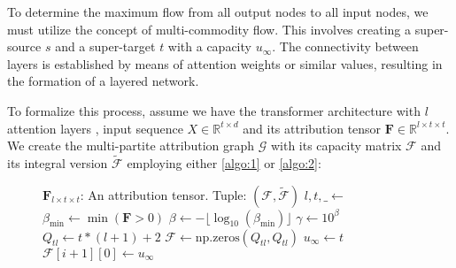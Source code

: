 \documentclass{article} %
\theoremstyle{bfnote}
\begin{document}
To determine the maximum flow from all output nodes to all input nodes, we must utilize the concept of multi-commodity flow. This involves creating a super-source $s$ and a super-target $t$ with a capacity $u_{\infty}$. The connectivity between layers is established by means of attention weights or similar values, resulting in the formation of a layered network.

To formalize this process, assume we have the transformer architecture with $l$ attention layers , input sequence $X\in \mathbb{R}^{t \times d}$ and its attribution tensor $\bm{F} \in \mathbb{R}^{l \times t \times t}$. We create the multi-partite attribution graph $\mathcal{G}$ with its capacity matrix $\mathcal{F}$ and its integral version $\widetilde{\mathcal{F}}$ employing either \cref{algo:1} or \cref{algo:2}:

\begin{figure}[!htbp]
	\centering
	\begin{minipage}{0.45\textwidth}
		\begin{algorithm}[H]
			\footnotesize
			\begin{algorithmic}[0]
				\Require $\bm{F}_{l\times t \times t}$: An attribution tensor.
				\Ensure Tuple: $(\mathcal{F}, \widetilde{\mathcal{F}})$
				\State $l, t, \text{$\_$} \gets$ 
				\State $\text{$\beta_{\min}$} \gets \min(\bm{F}>0)$
				\State $\text{$\beta$} \gets -\lfloor \log_{10}(\text{$\beta_{\min}$}) \rfloor$
				\State $\gamma \gets 10^\beta$
				\State $Q_{tl} \gets t \ast (l + 1) + 2$
				\State $\mathcal{\mathcal{F}} \gets \text{np.zeros} (Q_{tl}, Q_{tl})$
				\State $u_{\infty} \gets t$
				\State $\mathcal{F}[i+1][0] \gets u_{\infty}$
				\EndFor
				

\end{algorithmic}
\end{algorithm}
\end{minipage}
\end{figure}
\end{document}
